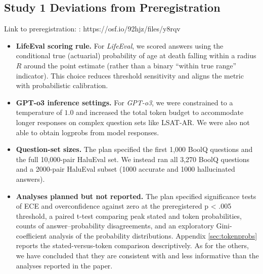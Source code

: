 \documentclass{article}
\begin{document}
\begin{center}
\end{center}




\vspace{0.5cm}

\appendix

\begin{appendices}
\section{Study 1 Deviations from Preregistration}
\label{Appendix: deviations}
Link to preregistration: : https://osf.io/92hjz/files/y8rqv
\begin{itemize}
  \item \textbf{LifeEval scoring rule.} For \textit{LifeEval}, we scored answers using the conditional true (actuarial) probability of age at death falling within a radius $R$ around the point estimate (rather than a binary “within true range” indicator). This choice reduces threshold sensitivity and aligns the metric with probabilistic calibration.

  \item \textbf{GPT-o3 inference settings.} 
  For \textit{GPT-o3}, we were constrained to a temperature of $1.0$ and increased the total token budget to accommodate longer responses on complex question sets like LSAT-AR. We were also not able to obtain logprobs from model responses.

  \item \textbf{Question-set sizes.} The plan specified the first 1,000 BoolQ questions and the full 10,000-pair HaluEval set. We instead ran all 3,270 BoolQ questions and a 2000-pair HaluEval subset (1000 accurate and 1000 hallucinated answers).
  
  \item \textbf{Analyses planned but not reported.} The plan specified significance tests of ECE and overconfidence against zero at the preregistered p < .005 threshold, a paired t-test comparing peak stated and token probabilities, counts of answer–probability disagreements, and an exploratory Gini-coefficient analysis of the probability distributions. Appendix \ref{sec:tokenprobs} reports the stated-versus-token comparison descriptively. As for the others, we have concluded that they are consistent with and less informative than the analyses reported in the paper. 

\end{itemize}


\end{appendices}
\end{document}
